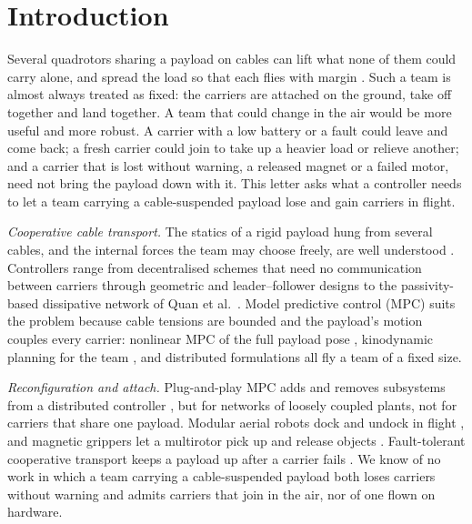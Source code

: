\section{Introduction}
\label{sec:intro}

Several quadrotors sharing a payload on cables can lift what none of them could carry alone, and spread the load so
that each flies with margin \cite{olleroPresentFutureAerial2022, estevezReviewAerialTransportation2024}. Such a team
is almost always treated as fixed: the carriers are attached on the ground, take off together and land together. A
team that could change in the air would be more useful and more robust. A carrier with a low battery or a fault could
leave and come back; a fresh carrier could join to take up a heavier load or relieve another; and a carrier that is
lost without warning, a released magnet or a failed motor, need not bring the payload down with it. This letter
asks what a controller needs to let a team carrying a cable-suspended payload lose and gain carriers in flight.

\emph{Cooperative cable transport.} The statics of a rigid payload hung from several cables, and the internal forces
the team may choose freely, are well understood \cite{michael2011cooperative, tognon2018internal,
gabellieri2023equilibria}. Controllers range from decentralised schemes that need no communication between carriers
\cite{tognon2018internal, gabellieri2023force, klausen2020cooperative} through geometric and leader--follower designs
\cite{lee2018geometric, loianno2018cooperative} to the passivity-based dissipative network of Quan et
al.~\cite{quan2025swarm}. Model predictive control (MPC) suits the problem because cable tensions are bounded and
the payload's motion couples every carrier: nonlinear MPC of the full payload pose \cite{sunNonlinearMPCFullPose2023,
liNonlinearModelPredictive2023}, kinodynamic planning for the team \cite{wahbaKinodynamicMotionPlanning2024}, and
distributed formulations \cite{decarliDistributedNMPCCooperative, distributedNMPC} all fly a team of a fixed size.

\emph{Reconfiguration and attach.} Plug-and-play MPC adds and removes subsystems from a distributed controller
\cite{riverso2013plug, zeilinger2013plug, aboudonia2022reconfigurable, saccani2023model}, but for networks of
loosely coupled plants, not for carriers that share one payload. Modular aerial robots dock and undock in flight
\cite{saldana2018modquad, sugihara2023trady, sugihara2026legion}, and magnetic grippers let a multirotor pick up and
release objects \cite{gawel2017magnetic, miyazaki2018airborne}. Fault-tolerant cooperative transport keeps a payload
up after a carrier fails \cite{liang2021fault, farrasFaultTolerantControlMultiQuadcopter2024}. We know of no work
in which a team carrying a cable-suspended payload both loses carriers without warning and admits carriers that join
in the air, nor of one flown on hardware.


